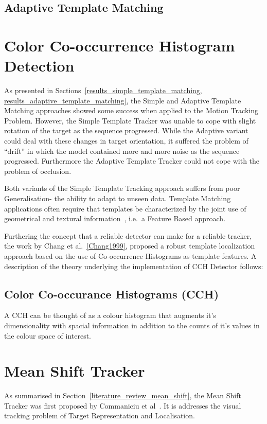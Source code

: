 \subsection{Adaptive Template Matching}\label{theoretical_framework_adaptive_tm}


\section{Color Co-occurrence Histogram Detection}\label{theoretical_framework_ch}
As presented in Sections~\ref{results_simple_template_matching,
results_adaptive_template_matching}, the Simple and Adaptive Template Matching
approaches showed some success when applied to the Motion
Tracking Problem. However, the Simple Template Tracker was unable to cope with
slight rotation of the target as the sequence progressed.
While the Adaptive variant could deal with these changes in target
orientation, it suffered the problem of ``drift'' in which the model contained
more and more noise as the sequence progressed.
Furthermore the Adaptive Template Tracker could not cope with the problem of
occlusion.

Both variants of the Simple Template Tracking approach suffers from poor Generalisation- the
ability to adapt to unseen data. Template Matching applications often require
that templates be characterized by the joint use of geometrical and textural
information~\cite{Brunelli}, i.e.\ a Feature Based approach.

Furthering the concept that a reliable detector can make for a reliable tracker,
the work by Chang et al.~\ref{Chang1999}, proposed a robust template
localization approach based on the use of Co-occurrence Histograms as template
features. A description of the theory underlying the implementation of CCH
Detector follows:

\subsection{Color Co-occurance Histograms (CCH)}
A CCH can be thought of as a colour histogram that augments it's dimensionality
with spacial information in addition to the counts of it's values in the colour
space of interest.



\section{Mean Shift Tracker}\label{theoretical_framework_mean_shift_tracker}
As summarised in Section~\ref{literature_review_mean_shift}, the Mean Shift Tracker was
first proposed by Commaniciu et al~\cite{Comaniciu2003}. It is addresses the
visual tracking problem of Target Representation and Localisation.

